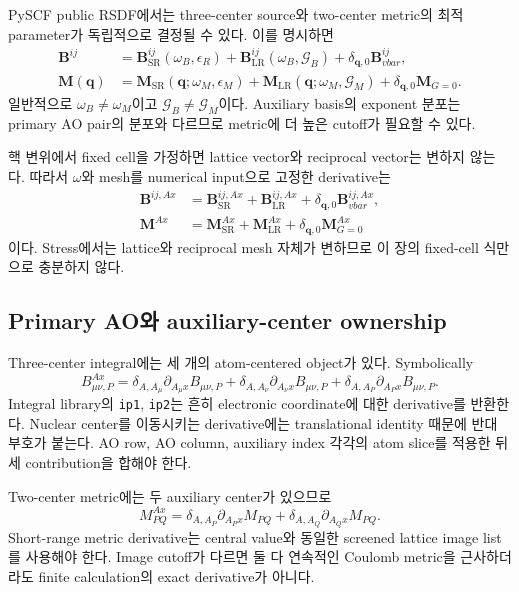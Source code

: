 PySCF public RSDF에서는 three-center source와 two-center metric의 최적 parameter가
독립적으로 결정될 수 있다. 이를 명시하면
\begin{align}
 \mathbf B^{ij}
 &=\mathbf B_{\mathrm{SR}}^{ij}(\omega_B,\epsilon_R)
 +\mathbf B_{\mathrm{LR}}^{ij}(\omega_B,\mathcal G_B)
 +\delta_{\mathbf q,0}\mathbf B_{vbar}^{ij},
 \label{eq:rsdf-source}\\
 \mathbf M(\mathbf q)
 &=\mathbf M_{\mathrm{SR}}(\mathbf q;\omega_M,\epsilon_M)
 +\mathbf M_{\mathrm{LR}}(\mathbf q;\omega_M,\mathcal G_M)
 +\delta_{\mathbf q,0}\mathbf M_{G=0}.
 \label{eq:rsdf-metric}
\end{align}
일반적으로 $\omega_B\neq\omega_M$이고 $\mathcal G_B\neq\mathcal G_M$이다. Auxiliary
basis의 exponent 분포는 primary AO pair의 분포와 다르므로 metric에 더 높은 cutoff가
필요할 수 있다.

핵 변위에서 fixed cell을 가정하면 lattice vector와 reciprocal vector는 변하지 않는다.
따라서 $\omega$와 mesh를 numerical input으로 고정한 derivative는
\begin{align}
 \mathbf B^{ij,Ax}
 &=\mathbf B_{\mathrm{SR}}^{ij,Ax}
 +\mathbf B_{\mathrm{LR}}^{ij,Ax}
 +\delta_{\mathbf q,0}\mathbf B_{vbar}^{ij,Ax},\\
 \mathbf M^{Ax}
 &=\mathbf M_{\mathrm{SR}}^{Ax}
 +\mathbf M_{\mathrm{LR}}^{Ax}
 +\delta_{\mathbf q,0}\mathbf M_{G=0}^{Ax}
\end{align}
이다. Stress에서는 lattice와 reciprocal mesh 자체가 변하므로 이 장의 fixed-cell 식만으로
충분하지 않다.

\subsection{Primary AO와 auxiliary-center ownership}

Three-center integral에는 세 개의 atom-centered object가 있다. Symbolically
\begin{equation}
 B_{\mu\nu,P}^{Ax}
 =\delta_{A,A_\mu}\partial_{A_\mu x}B_{\mu\nu,P}
 +\delta_{A,A_\nu}\partial_{A_\nu x}B_{\mu\nu,P}
 +\delta_{A,A_P}\partial_{A_Px}B_{\mu\nu,P}.
\end{equation}
Integral library의 \texttt{ip1}, \texttt{ip2}는 흔히 electronic coordinate에 대한 derivative를
반환한다. Nuclear center를 이동시키는 derivative에는 translational identity 때문에
반대 부호가 붙는다. AO row, AO column, auxiliary index 각각의 atom slice를 적용한 뒤
세 contribution을 합해야 한다.

Two-center metric에는 두 auxiliary center가 있으므로
\begin{equation}
 M_{PQ}^{Ax}
 =\delta_{A,A_P}\partial_{A_Px}M_{PQ}
 +\delta_{A,A_Q}\partial_{A_Qx}M_{PQ}.
\end{equation}
Short-range metric derivative는 central value와 동일한 screened lattice image list를
사용해야 한다. Image cutoff가 다르면 둘 다 연속적인 Coulomb metric을 근사하더라도
finite calculation의 exact derivative가 아니다.

